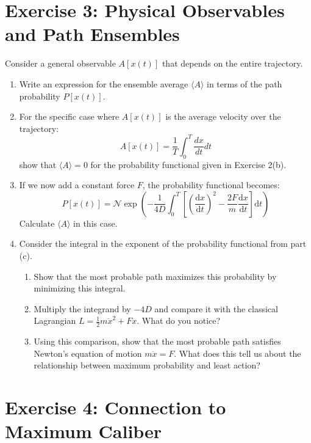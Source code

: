 \documentclass{article}
\begin{document}
\section*{Exercise 3: Physical Observables and Path Ensembles}

Consider a general observable $A[x(t)]$ that depends on the entire trajectory.

\begin{enumerate}
    \item[(a)] Write an expression for the ensemble average $\langle A \rangle$ in terms of the path probability $P[x(t)]$.
    
    \item[(b)] For the specific case where $A[x(t)]$ is the average velocity over the trajectory:
    \[ 
    A[x(t)] = \frac{1}{T}\int_0^T \frac{dx}{dt} dt 
    \]
    show that $\langle A \rangle = 0$ for the probability functional given in Exercise 2(b).
    
    \item[(c)] If we now add a constant force $F$, the probability functional becomes:
    \[ 
    P[x(t)] = \mathcal{N} \exp\left(-\frac{1}{4D}\int_0^T \left[\left(\frac{\text{d}x}{\text{d}t}\right)^2 - \frac{2F}{m}\frac{\text{d}x}{\text{d} t}\right] \text{d}t\right) 
    \]
    Calculate $\langle A \rangle$ in this case.

    \item[(d)] Consider the integral in the exponent of the probability functional from part (c).
    \begin{enumerate}
        \item[(i)] Show that the most probable path maximizes this probability by minimizing this integral.
        \item[(ii)] Multiply the integrand by $-4D$ and compare it with the classical Lagrangian $L = \frac{1}{2}m\dot{x}^2 + Fx$. What do you notice?
        \item[(iii)] Using this comparison, show that the most probable path satisfies Newton's equation of motion $m\ddot{x} = F$. What does this tell us about the relationship between maximum probability and least action?
    \end{enumerate}
\end{enumerate}

\section*{Exercise 4: Connection to Maximum Caliber}
\end{document}
